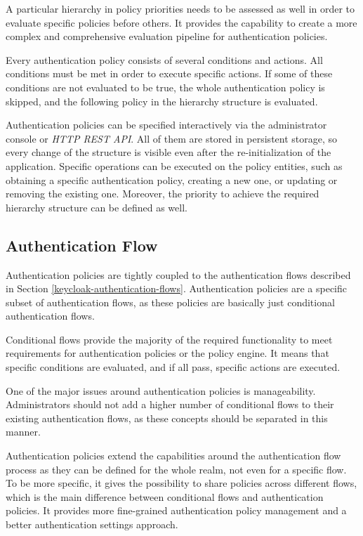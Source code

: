 A particular hierarchy in policy priorities needs to be assessed as well in order to evaluate specific policies before others.
It provides the capability to create a more complex and comprehensive evaluation pipeline for authentication policies.

Every authentication policy consists of several conditions and actions.
All conditions must be met in order to execute specific actions.
If some of these conditions are not evaluated to be true, the whole authentication policy is skipped, and the following policy in the hierarchy structure is evaluated.

Authentication policies can be specified interactively via the administrator console or \textit{HTTP REST API}.
All of them are stored in persistent storage, so every change of the structure is visible even after the re-initialization of the application. 
Specific operations can be executed on the policy entities, such as obtaining a specific authentication policy, creating a new one, or updating or removing the existing one.
Moreover, the priority to achieve the required hierarchy structure can be defined as well.

\subsection{Authentication Flow}

Authentication policies are tightly coupled to the authentication flows described in Section \ref{keycloak-authentication-flows}.
Authentication policies are a specific subset of authentication flows, as these policies are basically just conditional authentication flows.

Conditional flows provide the majority of the required functionality to meet requirements for authentication policies or the policy engine.
It means that specific conditions are evaluated, and if all pass, specific actions are executed.

One of the major issues around authentication policies is manageability.
Administrators should not add a higher number of conditional flows to their existing authentication flows, as these concepts should be separated in this manner.

Authentication policies extend the capabilities around the authentication flow process as they can be defined for the whole realm, not even for a specific flow.
To be more specific, it gives the possibility to share policies across different flows, which is the main difference between conditional flows and authentication policies.
It provides more fine-grained authentication policy management and a better authentication settings approach.

